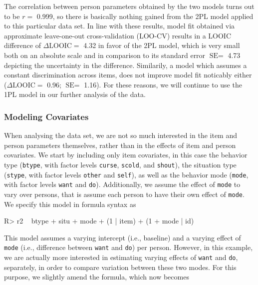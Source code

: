 \documentclass[jss]{jss}
\begin{document}
The correlation between person parameters obtained by the two models
turns out to be \(r =\) 0.999, so there is basically nothing gained from
the 2PL model applied to this particular data set. In line with these
results, model fit obtained via approximate leave-one-out
cross-validation (LOO-CV) results in a LOOIC difference of
\(\Delta \text{LOOIC} =\) 4.32 in favor of the 2PL model, which is very
small both on an absolute scale and in comparison to its standard error
\(\text{SE} =\) 4.73 depicting the uncertainty in the difference.
Similarily, a model which assumes a constant discrimination across
items, does not improve model fit noticably either
(\(\Delta \text{LOOIC} =\) 0.96; \(\text{SE} =\) 1.16). For these
reasons, we will continue to use the 1PL model in our further analysis
of the data.

\hypertarget{modeling-covariates}{%
\subsubsection{Modeling Covariates}\label{modeling-covariates}}

When analysing the  data set, we are not so much
interested in the item and person parameters themselves, rather than in
the effects of item and person covariates. We start by including only
item covariates, in this case the behavior type (\texttt{btype}, with
factor levels \texttt{curse}, \texttt{scold}, and \texttt{shout}), the
situation type (\texttt{stype}, with factor levels \texttt{other} and
\texttt{self}), as well as the behavior mode (\texttt{mode}, with factor
levels \texttt{want} and \texttt{do}). Additionally, we assume the
effect of \texttt{mode} to vary over persons, that is assume each person
to have their own effect of \texttt{mode}. We specify this model in
formula syntax as

\begin{CodeChunk}

\begin{CodeInput}
R> r2 ~ btype + situ + mode + (1 | item) + (1 + mode | id)
\end{CodeInput}
\end{CodeChunk}

This model assumes a varying intercept (i.e., baseline) and a varying
effect of \texttt{mode} (i.e., difference between \texttt{want} and
\texttt{do}) per person. However, in this example, we are actually more
interested in estimating varying effects of \texttt{want} and
\texttt{do}, separately, in order to compare variation between these two
modes. For this purpose, we slightly amend the formula, which now
becomes
\end{document}
